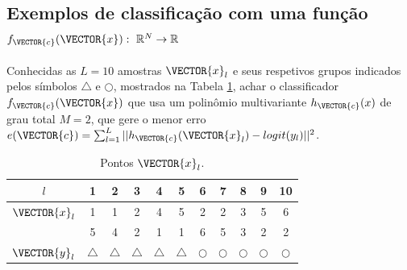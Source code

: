 \subsection{Exemplos de classificação com uma função
$f_{\VECTOR{c}}(\VECTOR{x}):~\mathbb{R}^N \rightarrow \mathbb{R}$ }

\begin{example}\label{ex:theo:reglogrnr1poly}
Conhecidas as $L=10$ amostras $\VECTOR{x}_l$ e seus respetivos grupos indicados pelos símbolos $\bigtriangleup$ e $\bigcirc$, 
mostrados na Tabela \ref{table:theo:reglogrnr1poly:xn},
achar o classificador $f_{\VECTOR{c}}(\VECTOR{x})$ que usa um polinômio multivariante $h_{\VECTOR{c}}(x)$
de grau total $M=2$, 
que gere o menor erro $e(\VECTOR{c}) =  \sum_{l=1}^{L} ||h_{\VECTOR{c}}(\VECTOR{x}_l)-logit(y_l)||^2$.
\end{example}


\begin{table}[h!]
\centering
\begin{tabular}{|c||c|c|c|c|c||c|c|c|c|c||} 
 \hline
$l$            & 1 & 2 & 3 & 4 & 5 & 6 & 7 & 8 & 9 & 10 \\ \hline \hline
$\VECTOR{x}_l$ & 1 & 1 & 2 & 4 & 5 & 2 & 2 & 3 & 5 & 6 \\ 
~              & 5 & 4 & 2 & 1 & 1 & 6 & 5 & 3 & 2 & 2 \\ \hline
$\VECTOR{y}_l$ & $\bigtriangleup$ & $\bigtriangleup$ & $\bigtriangleup$ & $\bigtriangleup$ & $\bigtriangleup$ 
      & $\bigcirc$ & $\bigcirc$ & $\bigcirc$ & $\bigcirc$ & $\bigcirc$\\ \hline
\end{tabular}
\caption{Pontos $\VECTOR{x}_l$.}
\label{table:theo:reglogrnr1poly:xn}
\end{table}


